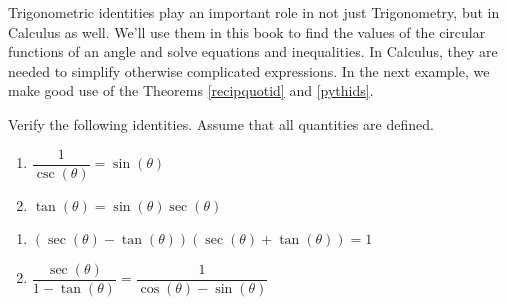 \smallskip

Trigonometric identities play an important role in not just Trigonometry, but in Calculus as well.  We'll use them in this book to find the values of the circular functions of an angle and solve equations and inequalities.  In Calculus, they are needed to simplify otherwise complicated expressions.  In the next example, we make good use of the Theorems \ref{recipquotid} and \ref{pythids}.

\begin{ex} \label{idornotex1} Verify the following identities. Assume that all quantities are defined.

\begin{multicols}{2}

\begin{enumerate}

\item  $\dfrac{1}{\csc(\theta)} = \sin(\theta)$

\item  $\tan(\theta) = \sin(\theta) \sec(\theta)$ 

\setcounter{HW}{\value{enumi}}

\end{enumerate}

\end{multicols}

\begin{multicols}{2}

\begin{enumerate}

\setcounter{enumi}{\value{HW}}

\item  $(\sec(\theta) - \tan(\theta)) (\sec(\theta) + \tan(\theta)) = 1$ 

\item  $\dfrac{\sec(\theta)}{1 - \tan(\theta)} = \dfrac{1}{\cos(\theta) - \sin(\theta)}$

\setcounter{HW}{\value{enumi}}

\end{enumerate}

\end{multicols}

\begin{multicols}{2}

\begin{enumerate}

\setcounter{enumi}{\value{HW}}


\end{enumerate}
\end{multicols}
\end{ex}
